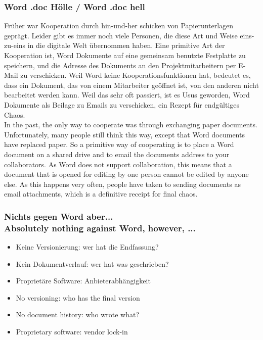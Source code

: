 {\scriptsize
\begin{frame}
  \frametitle{Word\textsuperscript{\tiny\textregistered} .doc Hölle /
    \textcolor{mfn_green}{Word\textsuperscript{\tiny\textregistered} .doc hell}}
Früher war Kooperation durch hin-und-her schicken von Papierunterlagen geprägt. Leider gibt es immer noch viele Personen, die diese Art und Weise eins-zu-eins in die digitale Welt übernommen haben. Eine primitive Art der Kooperation ist, Word Dokumente auf eine gemeinsam benutzte Festplatte zu speichern, und die Adresse des Dokuments an den Projektmitarbeitern per E-Mail zu verschicken. Weil Word keine Kooperationsfunktionen hat, bedeutet es, dass ein Dokument, das von einem Mitarbeiter geöffnet ist, von den anderen nicht bearbeitet werden kann. Weil das sehr oft passiert, ist es Usus geworden, Word Dokumente als Beilage zu Emails zu verschicken, ein Rezept für endgültiges Chaos.\\
  \bigskip
  \textcolor{mfn_green}{In the past, the only way to cooperate was through exchanging paper documents. Unfortunately, many people still think this way, except that Word documents have replaced paper. So a primitive way of cooperating is to place a Word document on a shared drive and to email the documents address to your collaborators. As Word does not support collaboration, this means that a document that is opened for editing by one person cannot be edited by anyone else. As this happens very often, people have taken to sending documents as email attachments, which is a definitive receipt for final chaos.}
\end{frame}
}
\begin{frame}
  \frametitle{Nichts gegen Word\textsuperscript{\tiny\textregistered} aber... \\
    \textcolor{mfn_green}{Absolutely nothing against Word\textsuperscript{\tiny\textregistered}, however, ...}}
  \begin{itemize}
  \item{Keine Versionierung: wer hat die Endfassung?}
  \item{Kein Dokumentverlauf: wer hat was geschrieben?}
  \item{Proprietäre Software: Anbieterabhängigkeit}
  \end{itemize}
  
  \begin{itemize}
  \item{\textcolor{mfn_green}{No versioning: who has the final version}}
  \item{\textcolor{mfn_green}{No document history: who wrote what?}}
  \item{\textcolor{mfn_green}{Proprietary software: vendor lock-in}}
  \end{itemize}
\end{frame}

